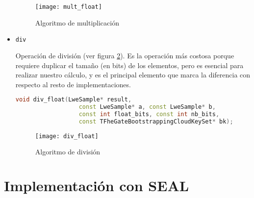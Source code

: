 \begin{itemize}
  \begin{figure}[h]
    \centering
    \texttt{[image: mult\_float]}
    \caption{Algoritmo de multiplicación}
    \label{fig:mult_float}
  \end{figure}

  \item \texttt{div}

  Operación de división (ver figura \ref{fig:div_float}). Es la operación más costosa porque requiere duplicar el tamaño (en bits) de los elementos, pero es esencial para realizar nuestro cálculo, y es el principal elemento que marca la diferencia con respecto al resto de implementaciones.

  \begin{lstlisting}[language=c++]
  void div_float(LweSample* result,
                  const LweSample* a, const LweSample* b,
                  const int float_bits, const int nb_bits,
                  const TFheGateBootstrappingCloudKeySet* bk);
  \end{lstlisting}

  \begin{figure}[h]
    \centering
    \texttt{[image: div\_float]}
    \caption{Algoritmo de división}
    \label{fig:div_float}
  \end{figure}


\end{itemize}

\section{Implementación con SEAL}


